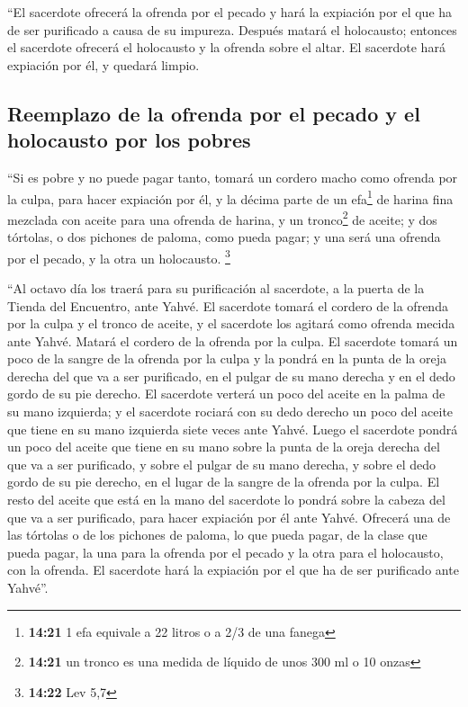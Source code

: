  ``El sacerdote ofrecerá la ofrenda por el pecado y hará
la expiación por el que ha de ser purificado a causa de su impureza.
Después matará el holocausto;  entonces el sacerdote
ofrecerá el holocausto y la ofrenda sobre el altar. El sacerdote hará
expiación por él, y quedará limpio.

\hypertarget{reemplazo-de-la-ofrenda-por-el-pecado-y-el-holocausto-por-los-pobres}{%
\subsection{Reemplazo de la ofrenda por el pecado y el holocausto por
los
pobres}\label{reemplazo-de-la-ofrenda-por-el-pecado-y-el-holocausto-por-los-pobres}}

 ``Si es pobre y no puede pagar tanto, tomará un cordero
macho como ofrenda por la culpa, para hacer expiación por él, y la
décima parte de un efa\footnote{\textbf{14:21} 1 efa equivale a 22
  litros o a 2/3 de una fanega} de harina fina mezclada con aceite para
una ofrenda de harina, y un tronco\footnote{\textbf{14:21} un tronco es
  una medida de líquido de unos 300 ml o 10 onzas} de aceite;
 y dos tórtolas, o dos pichones de paloma, como pueda
pagar; y una será una ofrenda por el pecado, y la otra un holocausto.
\footnote{\textbf{14:22} Lev 5,7}

 ``Al octavo día los traerá para su purificación al
sacerdote, a la puerta de la Tienda del Encuentro, ante Yahvé.
 El sacerdote tomará el cordero de la ofrenda por la
culpa y el tronco de aceite, y el sacerdote los agitará como ofrenda
mecida ante Yahvé.  Matará el cordero de la ofrenda por
la culpa. El sacerdote tomará un poco de la sangre de la ofrenda por la
culpa y la pondrá en la punta de la oreja derecha del que va a ser
purificado, en el pulgar de su mano derecha y en el dedo gordo de su pie
derecho.  El sacerdote verterá un poco del aceite en la
palma de su mano izquierda;  y el sacerdote rociará con
su dedo derecho un poco del aceite que tiene en su mano izquierda siete
veces ante Yahvé.  Luego el sacerdote pondrá un poco del
aceite que tiene en su mano sobre la punta de la oreja derecha del que
va a ser purificado, y sobre el pulgar de su mano derecha, y sobre el
dedo gordo de su pie derecho, en el lugar de la sangre de la ofrenda por
la culpa.  El resto del aceite que está en la mano del
sacerdote lo pondrá sobre la cabeza del que va a ser purificado, para
hacer expiación por él ante Yahvé.  Ofrecerá una de las
tórtolas o de los pichones de paloma, lo que pueda pagar,
 de la clase que pueda pagar, la una para la ofrenda por
el pecado y la otra para el holocausto, con la ofrenda. El sacerdote
hará la expiación por el que ha de ser purificado ante Yahvé''.

